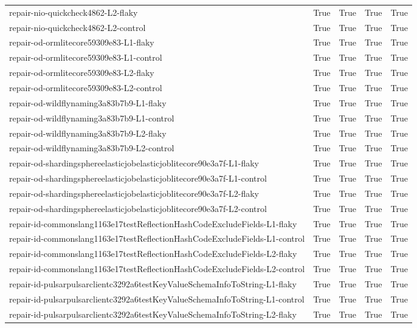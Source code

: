 \begin{table}[t]
\begin{tabular}{lllll}
repair-nio-quickcheck4862-L2-flaky & True & True & True & True \\
repair-nio-quickcheck4862-L2-control & True & True & True & True \\
repair-od-ormlitecore59309e83-L1-flaky & True & True & True & True \\
repair-od-ormlitecore59309e83-L1-control & True & True & True & True \\
repair-od-ormlitecore59309e83-L2-flaky & True & True & True & True \\
repair-od-ormlitecore59309e83-L2-control & True & True & True & True \\
repair-od-wildflynaming3a83b7b9-L1-flaky & True & True & True & True \\
repair-od-wildflynaming3a83b7b9-L1-control & True & True & True & True \\
repair-od-wildflynaming3a83b7b9-L2-flaky & True & True & True & True \\
repair-od-wildflynaming3a83b7b9-L2-control & True & True & True & True \\
repair-od-shardingsphereelasticjobelasticjoblitecore90e3a7f-L1-flaky & True & True & True & True \\
repair-od-shardingsphereelasticjobelasticjoblitecore90e3a7f-L1-control & True & True & True & True \\
repair-od-shardingsphereelasticjobelasticjoblitecore90e3a7f-L2-flaky & True & True & True & True \\
repair-od-shardingsphereelasticjobelasticjoblitecore90e3a7f-L2-control & True & True & True & True \\
repair-id-commonslang1163e17testReflectionHashCodeExcludeFields-L1-flaky & True & True & True & True \\
repair-id-commonslang1163e17testReflectionHashCodeExcludeFields-L1-control & True & True & True & True \\
repair-id-commonslang1163e17testReflectionHashCodeExcludeFields-L2-flaky & True & True & True & True \\
repair-id-commonslang1163e17testReflectionHashCodeExcludeFields-L2-control & True & True & True & True \\
repair-id-pulsarpulsarclientc3292a6testKeyValueSchemaInfoToString-L1-flaky & True & True & True & True \\
repair-id-pulsarpulsarclientc3292a6testKeyValueSchemaInfoToString-L1-control & True & True & True & True \\
repair-id-pulsarpulsarclientc3292a6testKeyValueSchemaInfoToString-L2-flaky & True & True & True & True \\

\end{tabular}
\end{table}
